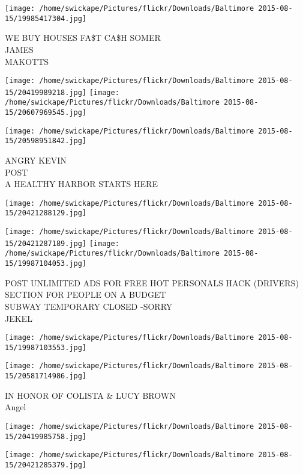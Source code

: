 \documentclass[10pt,letterpaper]{article}
\begin{document}
\vspace{0.25in}
\texttt{[image: /home/swickape/Pictures/flickr/Downloads/Baltimore 2015-08-15/19985417304.jpg]}

WE BUY HOUSES FA\$T CA\$H SOMER\\
JAMES\\
MAKOTTS\\
\pagebreak

\texttt{[image: /home/swickape/Pictures/flickr/Downloads/Baltimore 2015-08-15/20419989218.jpg]}
\texttt{[image: /home/swickape/Pictures/flickr/Downloads/Baltimore 2015-08-15/20607969545.jpg]}

\texttt{[image: /home/swickape/Pictures/flickr/Downloads/Baltimore 2015-08-15/20598951842.jpg]}

ANGRY KEVIN\\
POST\\
A HEALTHY HARBOR STARTS HERE\\
\pagebreak

\texttt{[image: /home/swickape/Pictures/flickr/Downloads/Baltimore 2015-08-15/20421288129.jpg]}

\vspace{0.25in}
\texttt{[image: /home/swickape/Pictures/flickr/Downloads/Baltimore 2015-08-15/20421287189.jpg]}
\texttt{[image: /home/swickape/Pictures/flickr/Downloads/Baltimore 2015-08-15/19987104053.jpg]}

POST UNLIMITED ADS FOR FREE HOT PERSONALS HACK (DRIVERS) SECTION FOR PEOPLE ON A BUDGET\\
SUBWAY TEMPORARY CLOSED {-}SORRY\\
JEKEL\\
\pagebreak

\texttt{[image: /home/swickape/Pictures/flickr/Downloads/Baltimore 2015-08-15/19987103553.jpg]}

\vspace{0.25in}
\texttt{[image: /home/swickape/Pictures/flickr/Downloads/Baltimore 2015-08-15/20581714986.jpg]}

IN HONOR OF COLISTA \& LUCY BROWN\\
Angel\\
\pagebreak

\texttt{[image: /home/swickape/Pictures/flickr/Downloads/Baltimore 2015-08-15/20419985758.jpg]}

\vspace{0.25in}
\texttt{[image: /home/swickape/Pictures/flickr/Downloads/Baltimore 2015-08-15/20421285379.jpg]}
\end{document}
